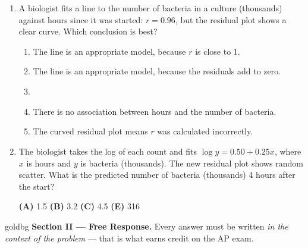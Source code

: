 \documentclass[12pt]{article}
\begin{document}
\begin{enumerate}[leftmargin=1.9em, itemsep=0.10in]

  \item A biologist fits a line to the number of bacteria in a culture (thousands) against
        hours since it was started: $r = 0.96$, but the residual plot shows a clear curve.
        Which conclusion is best?
        \begin{enumerate}[label=\textbf{(\Alph*)}, leftmargin=2.2em, itemsep=1pt]
          \item The line is an appropriate model, because $r$ is close to 1.
          \item The line is an appropriate model, because the residuals add to zero.
          \item {}
          \item There is no association between hours and the number of bacteria.
          \item The curved residual plot means $r$ was calculated incorrectly.
                \hfill{}\rule[-0.2in]{0pt}{0.48in}
        \end{enumerate}

  \item The biologist takes the log of each count and fits $\widehat{\log y} = 0.50 + 0.25x$,
        where $x$ is hours and $y$ is bacteria (thousands). The new residual plot shows random
        scatter. What is the predicted number of bacteria (thousands) 4 hours after the start?\hfill{}\rule[-0.2in]{0pt}{0.48in}
        \par\vspace{3pt}\noindent
        \hspace{1.2em}\textbf{(A)} 1.5 \hfill \textbf{(B)} 3.2 \hfill
        \textbf{(C)} 4.5 \hfill {} \hfill \textbf{(E)} 316

\end{enumerate}

\vspace{0.08in}

\boxguard[27]
\begin{headlinebox}{goldbg}
\small
\textbf{Section II --- Free Response.} Every answer must be written \emph{in the context of the
problem} --- that is what earns credit on the AP exam.
\end{headlinebox}
\end{document}
